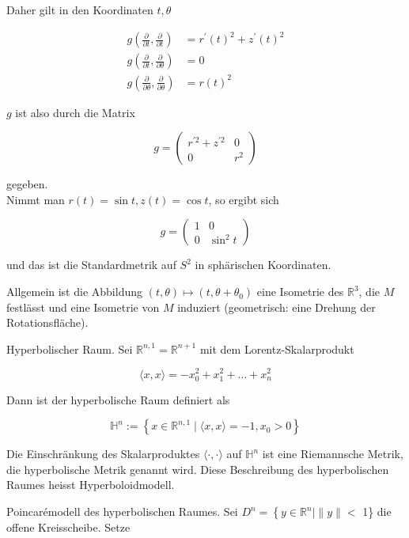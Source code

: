 \documentclass[10pt]{article}
\begin{document}
Daher gilt in den Koordinaten $t, \theta$

$$
\begin{aligned}
g\left(\frac{\partial}{\partial t}, \frac{\partial}{\partial t}\right) & =r^{\prime}(t)^{2}+z^{\prime}(t)^{2} \\
g\left(\frac{\partial}{\partial t}, \frac{\partial}{\partial \theta}\right) & =0 \\
g\left(\frac{\partial}{\partial \theta}, \frac{\partial}{\partial \theta}\right) & =r(t)^{2}
\end{aligned}
$$

$g$ ist also durch die Matrix

$$
g=\left(\begin{array}{cc}
r^{\prime 2}+z^{\prime 2} & 0 \\
0 & r^{2}
\end{array}\right)
$$

gegeben.\\
Nimmt man $r(t)=\sin t, z(t)=\cos t$, so ergibt sich

$$
g=\left(\begin{array}{cc}
1 & 0 \\
0 & \sin ^{2} t
\end{array}\right)
$$

und das ist die Standardmetrik auf $S^{2}$ in sphärischen Koordinaten.

Allgemein ist die Abbildung $(t, \theta) \mapsto\left(t, \theta+\theta_{0}\right)$ eine Isometrie des $\mathbb{R}^{3}$, die $M$ festlässt und eine Isometrie von $M$ induziert (geometrisch: eine Drehung der Rotationsfläche).

Hyperbolischer Raum. Sei $\mathbb{R}^{n, 1}=\mathbb{R}^{n+1}$ mit dem Lorentz-Skalarprodukt

$$
\langle x, x\rangle=-x_{0}^{2}+x_{1}^{2}+\ldots+x_{n}^{2}
$$

Dann ist der hyperbolische Raum definiert als

$$
\mathbb{H}^{n}:=\left\{x \in \mathbb{R}^{n, 1} \mid\langle x, x\rangle=-1, x_{0}>0\right\}
$$

Die Einschränkung des Skalarproduktes $\langle\cdot, \cdot\rangle$ auf $\mathbb{H}^{n}$ ist eine Riemannsche Metrik, die hyperbolische Metrik genannt wird. Diese Beschreibung des hyperbolischen Raumes heisst Hyperboloidmodell.

Poincarémodell des hyperbolischen Raumes. Sei $D^{n}=\left\{y \in \mathbb{R}^{n} \mid\|y\|<\right.$ 1\} die offene Kreisscheibe. Setze
\end{document}
